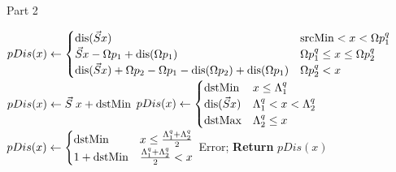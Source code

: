 \addtocounter{algorithm}{-1}
\begin{algorithm}[h]
\caption{Part 2}
\begin{algorithmic}[1]
          \State $
           pDis(x) \gets \begin{cases}
                    \text{dis}(\Scale x) & \srcMin < x < \eKeep_1^q \\
                    \Scale x - \eKeep_1 + \text{dis}(\eKeep_1) & \eKeep_1^q \le x \le \eKeep_2^q  \\
                    \text{dis}(\Scale x) + \eKeep_2 - \eKeep_1 - \text{dis}(\eKeep_2) + \text{dis}(\eKeep_1)  & \eKeep_2^q < x \\
                    \end{cases}   $
          \State   
          $  pDis(x) \gets \Scale \; x + \dstMin $
         \State  
         $ pDis(x) \gets \begin{cases}
          \dstMin & x \le \Discard_1^q \\
          \text{dis}(\Scale x) & \Discard_1^q < x < \Discard_2^q \\
          \dstMax & \Discard_2^q \le x  \\
          \end{cases} $
         \State   
         $  pDis(x) \gets \begin{cases}
           \text{dstMin} & x \le \frac{\Lambda_1^q + \Lambda_2^q}{2} \\
           1 + \text{dstMin}  &  \frac{\Lambda_1^q + \Lambda_2^q}{2} < x\\
           \end{cases} $
            \Else {}
            \State Error; 
            \EndIf
            \State \textbf{Return} {$pDis(x)$}
\end{algorithmic}
\end{algorithm}

